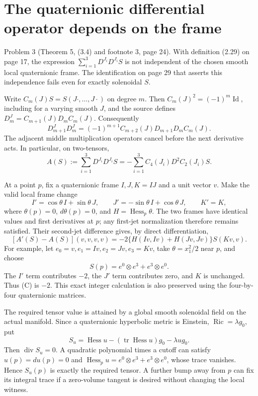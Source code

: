 \documentclass[10pt]{article}
\begin{document}
\section*{The quaternionic differential operator depends on the frame}
Problem 3 (Theorem 5, (3.4) and footnote 3, page 24).  With definition (2.29) on page 17, the expression \(\sum_{i=1}^3 D^{J_i}D^{J_i}S\) is not independent of the chosen smooth local quaternionic frame. The identification on page 29 that asserts this independence fails even for exactly solenoidal \(S\).\par
Write \(C_m(J)S=S(J\cdot,\ldots,J\cdot)\) on degree \(m\). Then \(C_m(J)^2=(-1)^m\operatorname{Id}\), including for a varying smooth \(J\), and the source defines \(D_m^J=C_{m+1}(J)D_mC_m(J)\). Consequently \[D_{m+1}^JD_m^J
   =(-1)^{m+1}C_{m+2}(J)D_{m+1}D_mC_m(J).\] The adjacent middle multiplication operators cancel before the next derivative acts. In particular, on two-tensors, \[A(S):=\sum_{i=1}^3D^{J_i}D^{J_i}S
      =-\sum_{i=1}^3 C_4(J_i)D^2C_2(J_i)S.\]\par
At a point \(p\), fix a quaternionic frame \(I,J,K=IJ\) and a unit vector \(v\). Make the valid local frame change \[I'=\cos\theta\,I+\sin\theta\,J,\qquad
 J'=-\sin\theta\,I+\cos\theta\,J,\qquad K'=K,\] where \(\theta(p)=0\), \(d\theta(p)=0\), and \(H=\operatorname{Hess}_p\theta\). The two frames have identical values and first derivatives at \(p\); any first-jet normalization therefore remains satisfied. Their second-jet difference gives, by direct differentiation, \[[A'(S)-A(S)](v,v,v,v)
   =-2\{H(Iv,Iv)+H(Jv,Jv)\}S(Kv,v).
 \tag{C}\] For example, let \(e_0=v,e_1=Iv,e_2=Jv,e_3=Kv\), take \(\theta=x_1^2/2\) near \(p\), and choose \[S(p)=e^0\otimes e^3+e^3\otimes e^0.\] The \(I'\) term contributes \(-2\), the \(J'\) term contributes zero, and \(K\) is unchanged. Thus (C) is \(-2\). This exact integer calculation is also preserved using the four-by-four quaternionic matrices.\par
The required tensor value is attained by a global smooth solenoidal field on the actual manifold. Since a quaternionic hyperbolic metric is Einstein, \(\operatorname{Ric}=\lambda g_0\), put \[S_u=\operatorname{Hess}u-(\operatorname{tr}\operatorname{Hess}u)g_0-\lambda u g_0.\] Then \(\operatorname{div}S_u=0\). A quadratic polynomial times a cutoff can satisfy \(u(p)=du(p)=0\) and \(\operatorname{Hess}_pu=e^0\otimes e^3+e^3\otimes e^0\), whose trace vanishes. Hence \(S_u(p)\) is exactly the required tensor. A further bump away from \(p\) can fix its integral trace if a zero-volume tangent is desired without changing the local witness.\par
\end{document}
